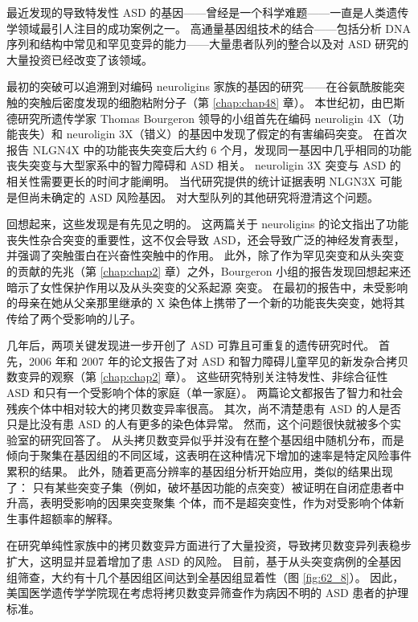 最近发现的导致特发性 ASD 的基因——曾经是一个科学难题——一直是人类遗传学领域最引人注目的成功案例之一。
高通量基因组技术的结合——包括分析 DNA 序列和结构中常见和罕见变异的能力——大量患者队列的整合以及对 ASD 研究的大量投资已经改变了该领域。


最初的突破可以追溯到对编码 neuroligins 家族的基因的研究——在谷氨酰胺能突触的突触后密度发现的细胞粘附分子（第 \ref{chap:chap48} 章）。
本世纪初，由巴斯德研究所遗传学家 Thomas Bourgeron 领导的小组首先在编码 neuroligin 4X（功能丧失）和 neuroligin 3X（错义）的基因中发现了假定的有害编码突变。
在首次报告 NLGN4X 中的功能丧失突变后大约 6 个月，发现同一基因中几乎相同的功能丧失突变与大型家系中的智力障碍和 ASD 相关。
neuroligin 3X 突变与 ASD 的相关性需要更长的时间才能阐明。
当代研究提供的统计证据表明 NLGN3X 可能是但尚未确定的 ASD 风险基因。 对大型队列的其他研究将澄清这个问题。


回想起来，这些发现是有先见之明的。
这两篇关于 neuroligins 的论文指出了功能丧失性杂合突变的重要性，这不仅会导致 ASD，还会导致广泛的神经发育表型，并强调了突触蛋白在兴奋性突触中的作用。
此外，除了作为罕见突变和从头突变的贡献的先兆（第 \ref{chap:chap2} 章）之外，Bourgeron 小组的报告发现回想起来还暗示了女性保护作用以及从头突变的父系起源 突变。
在最初的报告中，未受影响的母亲在她从父亲那里继承的 X 染色体上携带了一个新的功能丧失突变，她将其传给了两个受影响的儿子。


几年后，两项关键发现进一步开创了 ASD 可靠且可重复的遗传研究时代。
首先，2006 年和 2007 年的论文报告了对 ASD 和智力障碍儿童罕见的新发杂合拷贝数变异的观察（第 \ref{chap:chap2} 章）。
这些研究特别关注特发性、非综合征性 ASD 和只有一个受影响个体的家庭（单一家庭）。
两篇论文都报告了智力和社会残疾个体中相对较大的拷贝数变异率很高。
其次，尚不清楚患有 ASD 的人是否只是比没有患 ASD 的人有更多的染色体异常。
然而，这个问题很快就被多个实验室的研究回答了。
从头拷贝数变异似乎并没有在整个基因组中随机分布，而是倾向于聚集在基因组的不同区域，这表明在这种情况下增加的速率是特定风险事件累积的结果。
此外，随着更高分辨率的基因组分析开始应用，类似的结果出现了：
只有某些突变子集（例如，破坏基因功能的点突变）被证明在自闭症患者中升高，表明受影响的因果突变聚集 个体，而不是超突变性，作为对受影响个体新生事件超额率的解释。


在研究单纯性家族中的拷贝数变异方面进行了大量投资，导致拷贝数变异列表稳步扩大，这明显并显着增加了患 ASD 的风险。
目前，基于从头突变病例的全基因组筛查，大约有十几个基因组区间达到全基因组显着性（图 \ref{fig:62_8}）。
因此，美国医学遗传学学院现在考虑将拷贝数变异筛查作为病因不明的 ASD 患者的护理标准。


